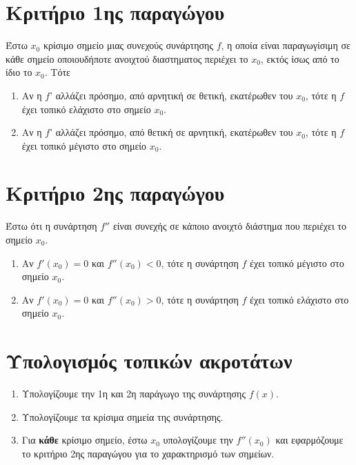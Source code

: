     \section*{Κριτήριο 1ης παραγώγου}
    Έστω $ x_{0} $ κρίσιμο σημείο μιας συνεχούς συνάρτησης $f$, η οποία είναι παραγωγίσιμη σε κάθε
    σημείο οποιουδήποτε ανοιχτού διαστηματος περιέχει το $ x_{0} $, εκτός ίσως από το ίδιο το $
    x_{0} $. Τότε
    \begin{enumerate}
        \item Αν η $f$' αλλάζει πρόσημο, από αρνητική σε θετική, εκατέρωθεν του $ x_{0} $, τότε η
            $f$ έχει τοπικό ελάχιστο στο σημείο $ x_{0} $.
        \item Αν η $f$' αλλάζει πρόσημο, από θετική σε αρνητική, εκατέρωθεν του $ x_{0} $, τότε η
            $f$ έχει τοπικό μέγιστο στο σημείο $ x_{0} $.
    \end{enumerate}

    \section*{Κριτήριο 2ης παραγώγου}
    Έστω ότι η συνάρτηση $ f'' $ είναι συνεχής σε κάποιο ανοιχτό διάστημα που περιέχει το σημείο $ x_{0} $.

\begin{enumerate}
    \item Αν $ f'(x_{0}) = 0 $ και $ f''(x_{0}) < 0 $, τότε η συνάρτηση $f$ έχει τοπικό μέγιστο στο
        σημείο $ x_{0} $.
    \item Αν $ f'(x_{0}) = 0 $ και $ f''(x_{0}) > 0 $, τότε η συνάρτηση $f$ έχει τοπικό ελάχιστο στο σημείο $ x_{0} $.

\end{enumerate}



    \section*{Υπολογισμός τοπικών ακροτάτων}
    \begin{enumerate}
        \item Υπολογίζουμε την 1η και 2η παράγωγο της συνάρτησης $ f(x) $.
        \item Υπολογίζουμε τα κρίσιμα σημεία της συνάρτησης.
        \item Για \textbf{κάθε} κρίσιμο σημείο, έστω $ x_{0} $ υπολογίζουμε την $ f''(x_{0}) $ και
            εφαρμόζουμε το κριτήριο 2ης παραγώγου για το χαρακτηρισμό των σημείων.
    \end{enumerate}

